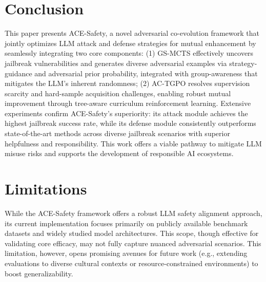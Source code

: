 \documentclass[11pt]{article}
\def\framework{ACE-Safety}
\def\attackmethod{GS-MCTS}
\def\trainingmethod{AC-TGPO}
\begin{document}

 



\section{Conclusion}
This paper presents {\framework}, a novel adversarial co-evolution framework that jointly optimizes LLM attack and defense strategies for mutual enhancement by seamlessly integrating two core components: (1) {\attackmethod} effectively uncovers jailbreak vulnerabilities and generates  diverse adversarial examples via strategy-guidance and adversarial prior probability, integrated with group-awareness that mitigates the LLM's inherent randomness; (2) {\trainingmethod} resolves supervision scarcity and hard-sample acquisition challenges, enabling robust mutual improvement through tree-aware curriculum reinforcement learning. Extensive experiments confirm {\framework}'s superiority: its attack module achieves the highest jailbreak success rate, while its defense module consistently outperforms state-of-the-art methods across diverse jailbreak scenarios with superior helpfulness and responsibility. This work offers a viable pathway to mitigate LLM misuse risks and supports the development of responsible AI ecosystems.

\section{Limitations}
While the {\framework} framework offers a robust LLM safety alignment approach, its current implementation focuses primarily on publicly available benchmark datasets and widely studied model architectures. This scope, though effective for validating core efficacy, may not fully capture nuanced adversarial scenarios. This limitation, however, opens promising avenues for future work (e.g., extending evaluations to diverse cultural contexts or resource-constrained environments) to boost generalizability.
\end{document}
